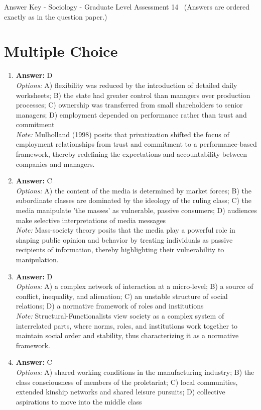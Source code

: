 \documentclass[12pt]{article}
\begin{document}
\begin{center}
Answer Key - Sociology - Graduate Level Assessment 14 \
\small (Answers are ordered exactly as in the question paper.)
\end{center}

\section*{Multiple Choice}
\begin{enumerate}[label=\arabic*.]
\item \textbf{Answer:} D
\\ \textit{Options:} A) flexibility was reduced by the introduction of detailed daily worksheets; B) the state had greater control than managers over production processes; C) ownership was transferred from small shareholders to senior managers; D) employment depended on performance rather than trust and commitment
\\ \textit{Note:} Mulholland (1998) posits that privatization shifted the focus of employment relationships from trust and commitment to a performance-based framework, thereby redefining the expectations and accountability between companies and managers.
\item \textbf{Answer:} C
\\ \textit{Options:} A) the content of the media is determined by market forces; B) the subordinate classes are dominated by the ideology of the ruling class; C) the media manipulate 'the masses' as vulnerable, passive consumers; D) audiences make selective interpretations of media messages
\\ \textit{Note:} Mass-society theory posits that the media play a powerful role in shaping public opinion and behavior by treating individuals as passive recipients of information, thereby highlighting their vulnerability to manipulation.
\item \textbf{Answer:} D
\\ \textit{Options:} A) a complex network of interaction at a micro-level; B) a source of conflict, inequality, and alienation; C) an unstable structure of social relations; D) a normative framework of roles and institutions
\\ \textit{Note:} Structural-Functionalists view society as a complex system of interrelated parts, where norms, roles, and institutions work together to maintain social order and stability, thus characterizing it as a normative framework.
\item \textbf{Answer:} C
\\ \textit{Options:} A) shared working conditions in the manufacturing industry; B) the class consciousness of members of the proletariat; C) local communities, extended kinship networks and shared leisure pursuits; D) collective aspirations to move into the middle class

\end{enumerate}
\end{document}
